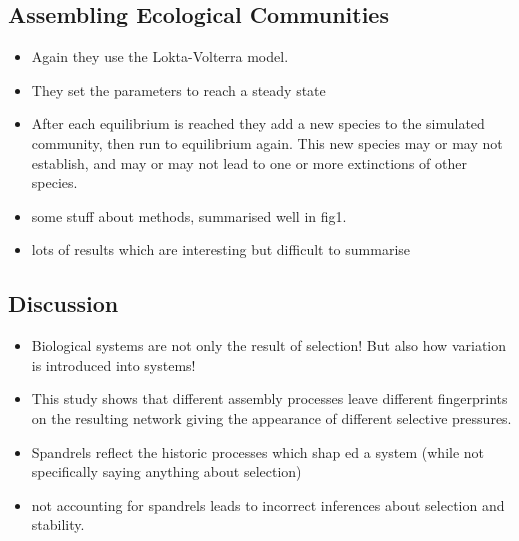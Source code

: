 \subsection*{Assembling Ecological Communities}
\begin{itemize}
	\item Again they use the Lokta-Volterra model.
	\item They set the parameters to reach a steady state
	\item After each equilibrium is reached they add a new species to the simulated community, then run to equilibrium again. This new species may or may not establish, and may or may not lead to one or more extinctions of other species.
	\item some stuff about methods, summarised well in fig1.
	\item lots of results which are interesting but difficult to summarise
\end{itemize}

\subsection*{Discussion}
\begin{itemize}
	\item Biological systems are not only the result of selection! But also how variation is introduced into systems!
	\item This study shows that different assembly processes leave different fingerprints on the resulting network giving the appearance of different selective pressures.
	\item Spandrels reflect the historic processes which shap	ed a system (while not specifically saying anything about selection)
	\item not accounting for spandrels leads to incorrect inferences about selection and stability.
\end{itemize}